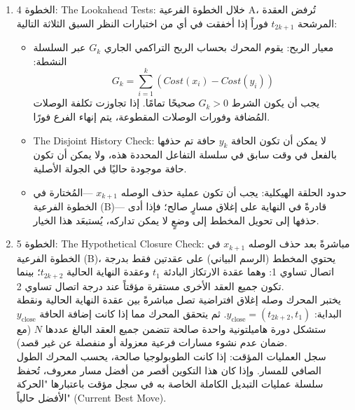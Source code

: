 \documentclass{article}
\newcommand{\en}[1]{\textenglish{#1}}
\begin{document}
\begin{enumerate}
\begin{itemize}
\begin{itemize}
				\item احذف الحافة $x_{k+1}$ مؤقتًا.
				\item سجل الحالة: تعود العقدة $t_{2k+1}$ إلى درجة صالحة 2. تنخفض درجة العقدة $t_{2k+2}$ المفصولة حديثًا إلى 1.
			\end{itemize}
	\end{itemize}

\item الخطوة 4: \en{The Lookahead Tests}:
خلال الخطوة الفرعية \en{A}، تُرفض العقدة المرشحة $t_{2k+1}$ فوراً إذا أخفقت في أي من اختبارات النظر السبق الثلاثة التالية:
	\begin{itemize}
		\item معيار الربح: يقوم المحرك بحساب الربح التراكمي الجاري $G_k$ عبر السلسلة النشطة:
			{\LARGE$$
				G_k = \sum_{i=1}^{k} (Cost(x_i) - Cost(y_i))
			$$}
يجب أن يكون الشرط $G_k > 0$ صحيحًا تمامًا. إذا تجاوزت تكلفة الوصلات المُضافة وفورات الوصلات المقطوعة، يتم إنهاء الفرع فورًا.
		\item \en{The Disjoint History Check}:
لا يمكن أن تكون الحافة $y_k$ حافة تم حذفها بالفعل في وقت سابق في سلسلة التفاعل المحددة هذه، ولا يمكن أن تكون حافة موجودة حاليًا في الجولة الأصلية.
		\item حدود الحلقة الهيكلية:
يجب أن تكون عملية حذف الوصله $x_{k+1}$ —المُختارة في الخطوة الفرعية (\en{B})— قادرةً في النهاية على إغلاق مسارٍ صالح؛ فإذا أدى حذفها إلى تحويل المخطط إلى وضعٍ لا يمكن تداركه، يُستبعَد هذا الخيار.
	\end{itemize}

\item الخطوة 5: \en{The Hypothetical Closure Check}:
مباشرةً بعد حذف الوصله $x_{k+1}$ في الخطوة الفرعية (\en{B})، يحتوي المخطط (الرسم البياني) على عقدتين فقط بدرجة اتصال تساوي 1: وهما عقدة الارتكاز البادئة $t_1$ وعقدة النهاية الحالية $t_{2k+2}$؛ بينما تكون جميع العقد الأخرى مستقرة مؤقتاً عند درجة اتصال تساوي 2.\\

يختبر المحرك وصله إغلاق افتراضية تصل مباشرةً بين عقدة النهاية الحالية ونقطة البداية: $y_{\text{close}} = (t_{2k+2}, t_1)$. ثم يتحقق المحرك مما إذا كانت إضافة الحافة $y_{\text{close}}$ ستشكل دورة هاميلتونية واحدة صالحة تتضمن جميع العقد البالغ عددها $N$ (مع ضمان عدم نشوء مسارات فرعية معزولة أو منفصلة عن غير قصد).\\

سجل العمليات المؤقت: إذا كانت الطوبولوجيا صالحة، يحسب المحرك الطول الصافي للمسار. وإذا كان هذا التكوين أقصر من أفضل مسار معروف، تُحفظ سلسلة عمليات التبديل الكاملة الخاصة به في سجل مؤقت باعتبارها "الحركة الأفضل حالياً" (\en{Current Best Move}).\\


\end{enumerate}
\end{document}
